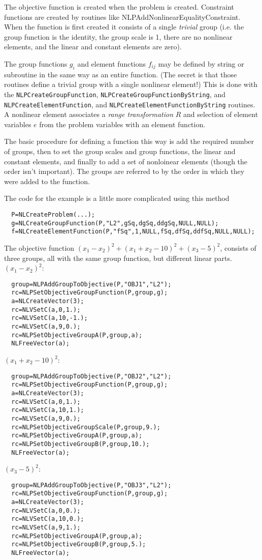 \documentclass[12pt]{article}
\begin{document}
    The objective function is created when the problem is created. Constraint functions are created 
    by routines like {NLPAddNonlinearEqualityConstraint}. When the function is first created it consists
    of a single {\it trivial} group (i.e. the group function is the identity, the group scale is 1, 
    there are no nonlinear elements, and the linear and constant elements are zero). 

    The group functions $g_i$ and element functions $f_{ij}$ may be defined by string or subroutine
    in the same way as an entire function. (The secret is that those routines define a trivial group
    with a single nonlinear element!) This is done with the {\tt NLP\-Create\-Group\-Function},
    {\tt NLP\-Create\-Group\-Function\-ByString}, and {\tt NLP\-Create\-Element\-Function}, and
    {\tt NLP\-Create\-Element\-Function\-ByString} routines. A nonlinear element associates a 
    {\it range transformation} $R$ and selection of element variables $e$ from the problem variables
    with an element function.

    The basic procedure for defining a function this way is add the required number of groups,
    then to set the group scales and group functions, 
    the linear and constant elements, and finally to add a set of nonloinear elements (though the order 
    isn't important). The groups are referred to by the order in which they were added to the function.

    The code for the example is a little more complicated using this method
\begin{verbatim}
  P=NLCreateProblem(...);
  g=NLCreateGroupFunction(P,"L2",gSq,dgSq,ddgSq,NULL,NULL);
  f=NLCreateElementFunction(P,"fSq",1,NULL,fSq,dfSq,ddfSq,NULL,NULL);

\end{verbatim}

  The objective function $(x_1-x_2)^2+(x_1+x_2-10)^2+(x_3-5)^2$, consists
  of three groups, all with the same group function, but different linear
  parts. $(x_1-x_2)^2$:
\begin{verbatim}
  group=NLPAddGroupToObjective(P,"OBJ1","L2");
  rc=NLPSetObjectiveGroupFunction(P,group,g);
  a=NLCreateVector(3);
  rc=NLVSetC(a,0,1.);
  rc=NLVSetC(a,10,-1.);
  rc=NLVSetC(a,9,0.);
  rc=NLPSetObjectiveGroupA(P,group,a);
  NLFreeVector(a);
\end{verbatim}
  $(x_1+x_2-10)^2$:
\begin{verbatim}
  group=NLPAddGroupToObjective(P,"OBJ2","L2");
  rc=NLPSetObjectiveGroupFunction(P,group,g);
  a=NLCreateVector(3);
  rc=NLVSetC(a,0,1.);
  rc=NLVSetC(a,10,1.);
  rc=NLVSetC(a,9,0.);
  rc=NLPSetObjectiveGroupScale(P,group,9.);
  rc=NLPSetObjectiveGroupA(P,group,a);
  rc=NLPSetObjectiveGroupB(P,group,10.);
  NLFreeVector(a);
\end{verbatim}
  $(x_3-5)^2$:
\begin{verbatim}
  group=NLPAddGroupToObjective(P,"OBJ3","L2");
  rc=NLPSetObjectiveGroupFunction(P,group,g);
  a=NLCreateVector(3);
  rc=NLVSetC(a,0,0.);
  rc=NLVSetC(a,10,0.);
  rc=NLVSetC(a,9,1.);
  rc=NLPSetObjectiveGroupA(P,group,a);
  rc=NLPSetObjectiveGroupB(P,group,5.);
  NLFreeVector(a);
\end{verbatim}
\end{document}
